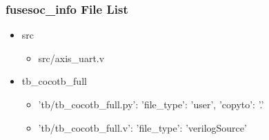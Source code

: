 \subsubsection{fusesoc\_info File List}
\begin{itemize}
\item src
	\begin{itemize}
	\item src/axis\_uart.v
	\end{itemize}
\item tb\_cocotb\_full
	\begin{itemize}
	\item {'tb/tb\_cocotb\_full.py': {'file\_type': 'user', 'copyto': '.'}}
	\item {'tb/tb\_cocotb\_full.v': {'file\_type': 'verilogSource'}}
	\end{itemize}
\end{itemize}
